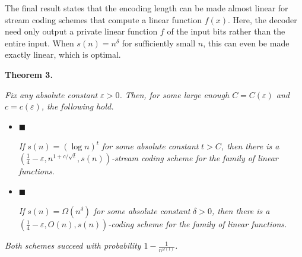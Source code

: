 


The final result states that the encoding length can be made almost linear for stream coding schemes that compute a linear function $f(x)$. Here, the decoder need only output a private linear function $f$ of the input bits rather than the entire input.
When $s(n)=n^{\delta}$ for sufficiently small $n$, this can even be made exactly linear, which is optimal.\par





\par\medskip\noindent\textbf{
\textbf{Theorem 3}\textbf{.}
}\par



\emph{Fix any absolute constant $\varepsilon>0$. Then, for some large enough
$C=C(\varepsilon)$ and $c=c(\varepsilon)$, the following hold.}\par


\begin{itemize}


\item[] 
$\blacksquare$ 


\emph{If }$s(n)=(\log n)^{t}$\emph{ for some absolute constant }$t>C$\emph{, then there is a }$\left(\frac{1}{4}-\varepsilon,n^{1+c/\sqrt{t}},s(n)\right)$\emph{-stream coding scheme for the family of linear functions.}\par





\item[] 
$\blacksquare$ 


\emph{If }$s(n)=\Omega(n^{\delta})$\emph{ for some absolute constant }$\delta>0$\emph{, then there is a }$\left(\frac{1}{4}-\varepsilon,O(n),s(n)\right)$\emph{-coding scheme for the family of linear functions.}\par





\end{itemize}


\emph{Both schemes succeed with probability $1-\frac{1}{n^{\omega(1)}}$.}\par







